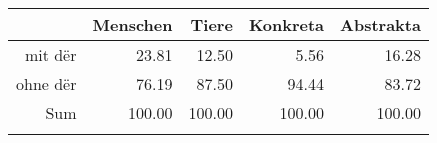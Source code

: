 \begin{tabular}{rrrrr}
  \lsptoprule
 & Menschen & Tiere & Konkreta & Abstrakta \\ 
  \midrule
mit dër & 23.81 & 12.50 & 5.56 & 16.28 \\ 
  ohne dër & 76.19 & 87.50 & 94.44 & 83.72 \\ 
  Sum & 100.00 & 100.00 & 100.00 & 100.00 \\ 
   \lspbottomrule
\end{tabular}

